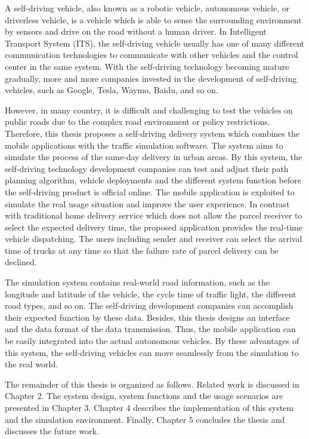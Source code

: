 \documentclass[12pt]{ksthesis}
\begin{document}
\begin{thesis}
{A self-driving vehicle, also known as a robotic vehicle, autonomous vehicle, or driverless vehicle, is a vehicle which is able to sense the surrounding environment by sensors and drive on the road without a human driver. In Intelligent Transport System (ITS), the self-driving vehicle usually has one of many different communication technologies to communicate with other vehicles and the control center in the same system. With the self-driving technology becoming mature gradually, more and more companies invested in the development of self-driving vehicles, such as Google, Tesla, Waymo, Baidu, and so on. 

However, in many country, it is difficult and challenging to test the vehicles on public roads due to the complex road environment or policy restrictions. Therefore, this thesis proposes a self-driving delivery system which combines the mobile applications with the traffic simulation software. The system aims to simulate the process of the same-day delivery in urban areas. By this system, the self-driving technology development companies can test and adjust their path planning algorithm, vehicle deployments and the different system function before the self-driving product is official online. The mobile application is exploited to simulate the real usage situation and improve the user experience. In contrast with traditional home delivery service \cite{Jiang2018} which does not allow the parcel receiver to select the expected delivery time, the proposed application provides the real-time vehicle dispatching. The users including sender and receiver can select the arrival time of trucks at any time so that the failure rate of parcel delivery can be declined. 

The simulation system contains real-world road information, such as the longitude and latitude of the vehicle, the cycle time of traffic light, the different road types, and so on. The self-driving development companies can accomplish their expected function by these data. Besides, this thesis designs an interface and the data format of the data transmission. Thus, the mobile application can be easily integrated into the actual autonomous vehicles. By these advantages of this system, the self-driving vehicles can move seamlessly from the simulation to the real world. 

The remainder of this thesis is organized as follows. Related work is discussed in Chapter 2. The system design, system functions and the usage scenarios are presented in Chapter 3. Chapter 4 describes the implementation of this system and the simulation environment. Finally, Chapter 5 concludes the thesis and discusses the future work.



}
\end{thesis}
\end{document}
